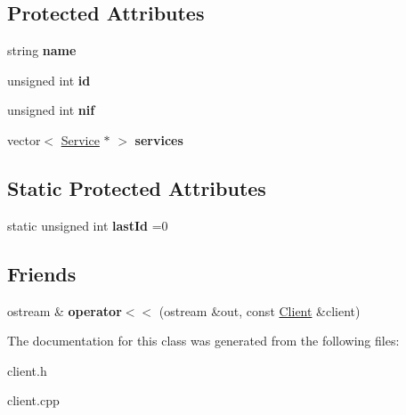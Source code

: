 \subsection*{Protected Attributes}
\begin{DoxyCompactItemize}
\item 
\mbox{\label{class_client_a456e36f9972a8bf3ecdb5f0e70b3bd5d}} 
string {\bfseries name}
\item 
\mbox{\label{class_client_adad90ca6a484cb64345ca62f1c7979ce}} 
unsigned int {\bfseries id}
\item 
\mbox{\label{class_client_a1c94dc96a56cb5032573fb1d528517c2}} 
unsigned int {\bfseries nif}
\item 
\mbox{\label{class_client_a02b601f12b9905edae7e64ded9bde912}} 
vector$<$ \hyperlink{class_service}{Service} $\ast$ $>$ {\bfseries services}
\end{DoxyCompactItemize}
\subsection*{Static Protected Attributes}
\begin{DoxyCompactItemize}
\item 
\mbox{\label{class_client_a515d8893da8949a5189865e19461c737}} 
static unsigned int {\bfseries last\+Id} =0
\end{DoxyCompactItemize}
\subsection*{Friends}
\begin{DoxyCompactItemize}
\item 
\mbox{\label{class_client_a001b1071dc56da194d697f845bbc4b1b}} 
ostream \& {\bfseries operator$<$$<$} (ostream \&out, const \hyperlink{class_client}{Client} \&client)
\end{DoxyCompactItemize}


The documentation for this class was generated from the following files\+:\begin{DoxyCompactItemize}
\item 
client.\+h\item 
client.\+cpp\end{DoxyCompactItemize}
